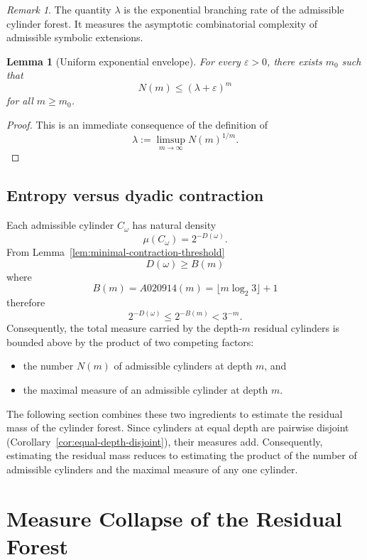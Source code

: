 \documentclass[12pt, oneside]{article}
\numberwithin{equation}{section}
\theoremstyle{definition}
\theoremstyle{plain}
\newtheorem{lemma}[theorem]{Lemma}
\theoremstyle{remark}
\newtheorem*{remark}{Remark}
\begin{document}
\begin{remark}
The quantity \(\lambda\) is the exponential branching rate of the
admissible cylinder forest. It measures the asymptotic combinatorial
complexity of admissible symbolic extensions.
\end{remark}

\begin{lemma}[Uniform exponential envelope]
\label{lem:uniform-envelope}
For every \(\varepsilon>0\), there exists \(m_0\) such that
\[
N(m) \le (\lambda+\varepsilon)^m
\]
for all \(m\ge m_0\).
\end{lemma}

\begin{proof}
This is an immediate consequence of the definition of
\[
\lambda := \limsup_{m\to\infty} N(m)^{1/m}.
\]
\end{proof}

\subsection{Entropy versus dyadic contraction}

Each admissible cylinder \(C_\omega\) has natural density
\[
\mu(C_\omega)=2^{-D(\omega)}.
\]
From Lemma~\ref{lem:minimal-contraction-threshold}
\[
D(\omega) \ge B(m)
\]
where
\[
B(m) = A020914(m) = \lfloor m\log_2 3\rfloor + 1
\]
therefore
\[
2^{-D(\omega)} \le 2^{-B(m)} < 3^{-m}.
\]
Consequently, the total measure carried by the depth-\(m\) residual
cylinders is bounded above by the product of two competing factors:
\begin{itemize}
\item the number \(N(m)\) of admissible cylinders at depth \(m\), and
\item the maximal measure of an admissible cylinder at depth \(m\).
\end{itemize}

The following section combines these two ingredients to estimate the
residual mass of the cylinder forest. Since cylinders at equal depth
are pairwise disjoint (Corollary~\ref{cor:equal-depth-disjoint}),
their measures add.  Consequently, estimating the residual mass reduces
to estimating the product of the number of admissible cylinders and
the maximal measure of any one cylinder.

\section{Measure Collapse of the Residual Forest}
\label{sec:measure-collapse}
\end{document}
